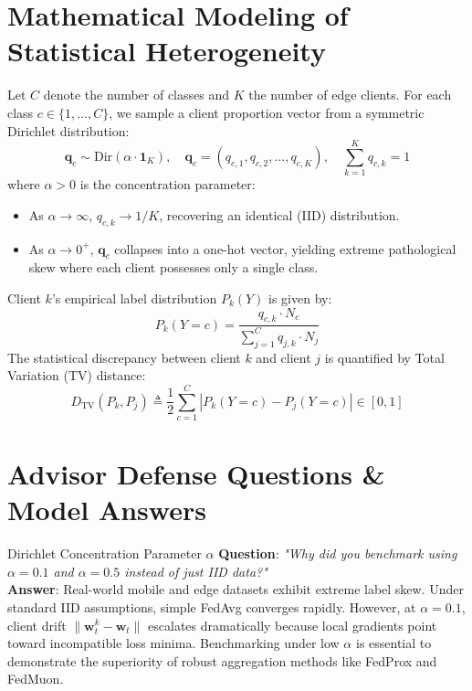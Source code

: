 \documentclass[11pt,a4paper,titlepage]{report}
\begin{document}
\section{Mathematical Modeling of Statistical Heterogeneity}
\begin{mathfoundation}
Let $C$ denote the number of classes and $K$ the number of edge clients. For each class $c \in \{1, \dots, C\}$, we sample a client proportion vector from a symmetric Dirichlet distribution:
\begin{equation}
    \mathbf{q}_c \sim \text{Dir}(\alpha \cdot \mathbf{1}_K), \quad \mathbf{q}_c = (q_{c, 1}, q_{c, 2}, \dots, q_{c, K}), \quad \sum_{k=1}^K q_{c, k} = 1
\end{equation}
where $\alpha > 0$ is the concentration parameter:
\begin{itemize}
    \item As $\alpha \to \infty$, $q_{c, k} \to 1/K$, recovering an identical (IID) distribution.
    \item As $\alpha \to 0^+$, $\mathbf{q}_c$ collapses into a one-hot vector, yielding extreme pathological skew where each client possesses only a single class.
\end{itemize}
Client $k$'s empirical label distribution $P_k(Y)$ is given by:
\begin{equation}
    P_k(Y = c) = \frac{q_{c, k} \cdot N_c}{\sum_{j=1}^C q_{j, k} \cdot N_j}
\end{equation}
The statistical discrepancy between client $k$ and client $j$ is quantified by Total Variation (TV) distance:
\begin{equation}
    D_{\text{TV}}(P_k, P_j) \triangleq \frac{1}{2} \sum_{c=1}^C |P_k(Y = c) - P_j(Y = c)| \in [0, 1]
\end{equation}
\end{mathfoundation}

\section{Advisor Defense Questions \& Model Answers}
\begin{defenseqa}{Dirichlet Concentration Parameter $\alpha$}
\textbf{Question}: \textit{"Why did you benchmark using $\alpha = 0.1$ and $\alpha = 0.5$ instead of just IID data?"}\\
\textbf{Answer}: Real-world mobile and edge datasets exhibit extreme label skew. Under standard IID assumptions, simple FedAvg converges rapidly. However, at $\alpha = 0.1$, client drift $\|\mathbf{w}_t^k - \mathbf{w}_t\|$ escalates dramatically because local gradients point toward incompatible loss minima. Benchmarking under low $\alpha$ is essential to demonstrate the superiority of robust aggregation methods like FedProx and FedMuon.
\end{defenseqa}
\end{document}
